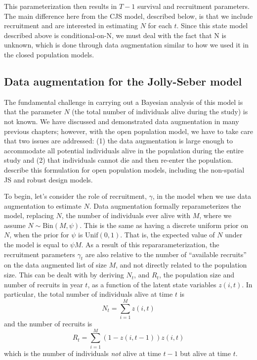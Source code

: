 This parameterization then results in $T-1$ survival and recruitment
parameters.  The main difference here from the CJS model, described below,
 is that we include recruitment and are interested in estimating $N$ for each $t$.
Since this state model described above is conditional-on-N, we must
deal with the fact that N is unknown, which is done through data
augmentation similar to how we used it in the closed population
models.


\subsection{Data augmentation for the Jolly-Seber model}

The fundamental challenge in carrying out a
Bayesian analysis of this model
is that the parameter $N$ (the total number of individuals alive
during the study) 
is not known.  We have discussed and
demonstrated data augmentation in many previous chapters; however,
with the open population model, we have to take care that two issues
are addressed: (1) the data augmentation is large enough to accommodate
all potential individuals alive in the population during the entire
study and (2) that individuals cannot die and then re-enter the
population.  \citep{royle_dorazio:2008} describe this formulation for 
open population models, including the non-spatial JS and robust
design models. 

To begin, let's consider the role of recruitment, $\gamma$, in the
model when we use data augmentation to estimate $N$. 
Data augmentation formally reparameterizes the model, replacing $N$,
the number of individuals ever alive with $M$, where we
assume $N \sim \mbox {Bin}(M, \psi)$.  This is the same as having
a discrete uniform prior on $N$, when the prior for $\psi$ is $\mbox{Unif}(0,1)$.
That is, the expected value of $N$ under the model is equal to
$\psi M$.  As a result of this repararameterization, the recruitment
parameters $\gamma_{t}$ are also relative to the number of ``available
recruits'' on the data augmented list of size $M$, and not directly
related to the population size.  This can be dealt with 
by deriving
$N_t$, and $R_{t}$, the population size and number of recruits in year
$t$, as a function of the latent state variables $z(i,t)$.  In
particular, the total number of individuals alive at time $t$ is
\[
N_{t} = \sum_{i=1}^{M} z(i,t)
\]
and the number of recruits is
\[
R_{t} = \sum_{i=1}^{M} (1-z(i,t-1))z(i,t)
\]
which is the number of individuals {\it not} alive at time $t-1$ but
alive at time $t$.

